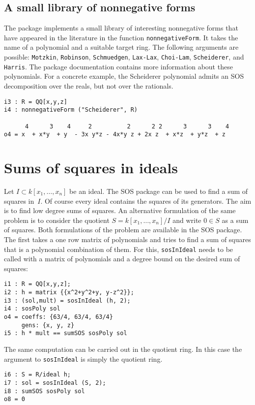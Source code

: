 \documentclass[11pt]{amsart}
\theoremstyle{plain}%
\theoremstyle{definition}
\theoremstyle{remark}
\newcommand{\SOS}{\textsc{SOS}\xspace}
\begin{document}
\subsection*{A small library of nonnegative forms}
The package implements a small library of interesting nonnegative forms that have appeared in the literature in the function  \verb|nonnegativeForm|.
It takes the name of a polynomial and a suitable target ring.
The following arguments are possible: \verb|Motzkin|, \verb|Robinson|, \verb|Schmuedgen|, \verb|Lax-Lax|, \verb|Choi-Lam|, \verb|Scheiderer|, and \verb|Harris|.
The package documentation contains more information about these polynomials.
For a concrete example, the Scheiderer polynomial admits an SOS decomposition over the reals, but not over the rationals.
{\small
\begin{verbatim}
i3 : R = QQ[x,y,z]
i4 : nonnegativeForm ("Scheiderer", R)

      4      3    4     2          2      2 2      3      3    4
o4 = x  + x*y  + y  - 3x y*z - 4x*y z + 2x z  + x*z  + y*z  + z

\end{verbatim}
}

\section{Sums of squares in ideals}
Let $I \subset k[x_{1},\dots,x_{n}]$ be an ideal.  The \SOS package can be used to find a sum of squares in~$I$.
Of course every ideal contains the squares of its generators.
The aim is to find low degree sums of squares.
An alternative formulation of the same problem is to consider the quotient $S = k[x_{1},\dots,x_{n}]/I$ and write $0\in S$ as a sum of squares.
Both formulations of the problem are available in the \SOS package.
The first takes a one row matrix of polynomials and tries to find a sum of squares that is a polynomial combination of them.
For this, \verb|sosInIdeal| needs to be called with a matrix of polynomials and a degree bound on the desired sum of squares:
{\small
\begin{verbatim}
i1 : R = QQ[x,y,z];
i2 : h = matrix {{x^2+y^2+y, y-z^2}};
i3 : (sol,mult) = sosInIdeal (h, 2);
i4 : sosPoly sol
o4 = coeffs: {63/4, 63/4, 63/4}
     gens: {x, y, z}
i5 : h * mult == sumSOS sosPoly sol
\end{verbatim}
}
The same computation can be carried out in the quotient ring.
In this case the argument to \verb|sosInIdeal| is simply the quotient ring.
{\small
\begin{verbatim}
i6 : S = R/ideal h;
i7 : sol = sosInIdeal (S, 2);
i8 : sumSOS sosPoly sol
o8 = 0
\end{verbatim}
}
\end{document}
